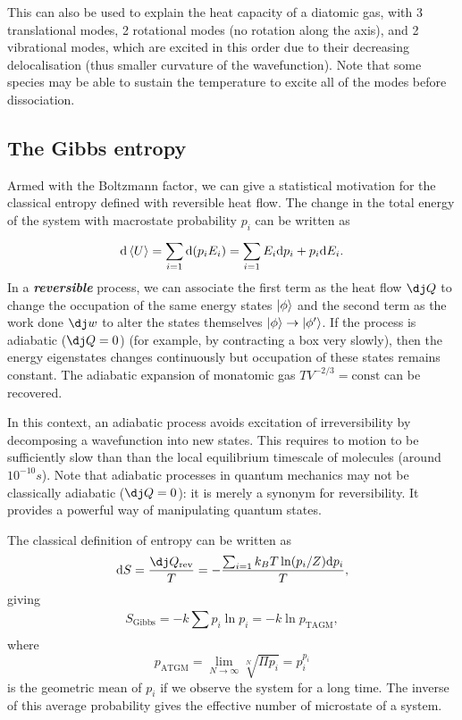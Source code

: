 \documentclass{article}
\theoremstyle{nonumberplain}
\begin{document}
This can also be used to explain the heat capacity of a diatomic gas, with 3 translational modes, 2 rotational modes (no rotation along the axis), and 2 vibrational modes, which are excited in this order due to their decreasing delocalisation (thus smaller curvature of the wavefunction). Note that some species may be able to sustain the temperature to excite all of the modes before dissociation. 

\subsection{The Gibbs entropy}
Armed with the Boltzmann factor, we can give a statistical motivation for the classical entropy defined with reversible heat flow. The change in the total energy of the system with macrostate probability $p_i$ can be written as
\[
    \mathrm{d} \expval{U} = \sum_{i=1}^{} \mathrm{d} (p_i E_i) = \sum_{i=1}^{} E_i \mathrm{d} p_i + p_i \mathrm{d} E_i . 
\]
In a \textit{\textbf{reversible}} process, we can associate the first term as the heat flow $\dj Q$ to change the occupation of the same energy states $\ket{\phi}$ and the second term as the work done $\dj w $ to alter the states themselves $\ket{\phi} \to \ket{\phi^\prime }$. If the process is adiabatic ($\dj Q = 0$) (for example, by contracting a box very slowly), then the energy eigenstates changes continuously but occupation of these states remains constant. The adiabatic expansion of monatomic gas $T V^{-2 /3} = \mathrm{const} $ can be recovered. 

In this context, an adiabatic process avoids excitation of irreversibility by decomposing a wavefunction into new states. This requires to motion to be sufficiently slow than than the local equilibrium timescale of molecules (around $10^{-10} s$). Note that adiabatic processes in quantum mechanics may not be classically adiabatic ($\dj Q = 0$): it is merely a synonym for reversibility. It provides a powerful way of manipulating quantum states. 

The classical definition of entropy can be written as
\[
    \mathrm{d} S = \frac{\dj Q_{\mathrm{rev} }}{T} = - \frac{\sum_{i=1}^{} k_B T \ln(p_i / Z) \mathrm{d} p_i}{T},  
\]
giving 
\[
    \boxed{S_{\mathrm{Gibbs} } = -k \sum_{}^{} p_i \ln{p_i} = -k \ln p_{\mathrm{TAGM} } ,}
\]
where 
\[
    p_{\mathrm{ATGM} }  = \lim_{N\to \infty } \sqrt[N]{\Pi p_i} = p_i^{p_i}
\]
is the geometric mean of $p_i$ if we observe the system for a long time. The inverse of this average probability gives the effective number of microstate of a system. 
\end{document}
